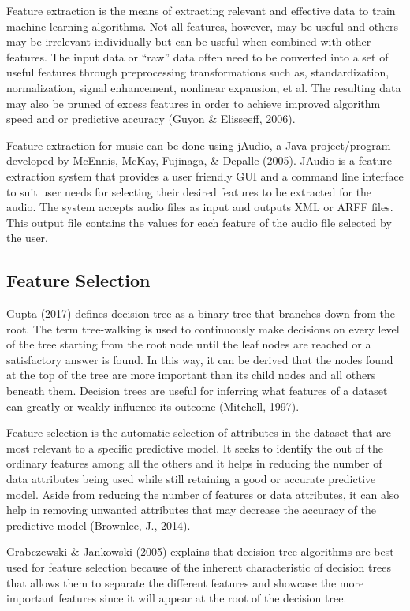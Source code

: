 Feature extraction is the means of extracting relevant and effective data to train machine learning algorithms. Not all features, however, may be useful and others may be irrelevant individually but can be useful when combined with other features. The input data or “raw” data often need to be converted into a set of useful features through preprocessing transformations such as, standardization, normalization, signal enhancement, nonlinear expansion, et al. The resulting data may also be pruned of excess features in order to achieve improved algorithm speed and or predictive accuracy (Guyon \& Elisseeff, 2006).


Feature extraction for music can be done using jAudio, a Java project/program developed by McEnnis, McKay, Fujinaga, \& Depalle (2005). JAudio is a feature extraction system that provides a user friendly GUI and a command line interface to suit user needs for selecting their desired features to be extracted for the audio. The system accepts audio files as input and outputs XML or ARFF files. This output file contains the values for each feature of the audio file selected by the user.

\subsection{Feature Selection}

Gupta (2017) defines decision tree as a binary tree that branches down from the root. The term tree-walking is used to continuously make decisions on every level of the tree starting from the root node until the leaf nodes are reached or a satisfactory answer is found. In this way, it can be derived that the nodes found at the top of the tree are more important than its child nodes and all others beneath them. Decision trees are useful for inferring what features of a dataset can greatly or weakly influence its outcome (Mitchell, 1997).

Feature selection is the automatic selection of attributes in the dataset that are most relevant to a specific predictive model. It seeks to identify the out of the ordinary features among all the others and it helps in reducing the number of data attributes being used while still retaining a good or accurate predictive model. Aside from reducing the number of features or data attributes, it can also help in removing unwanted attributes that may decrease the accuracy of the predictive model (Brownlee, J., 2014).

Grabczewski \& Jankowski (2005) explains that decision tree algorithms are best used for feature selection because of the inherent characteristic of decision trees that allows them to separate the different features and showcase the more important features since it will appear at the root of the decision tree.
	
